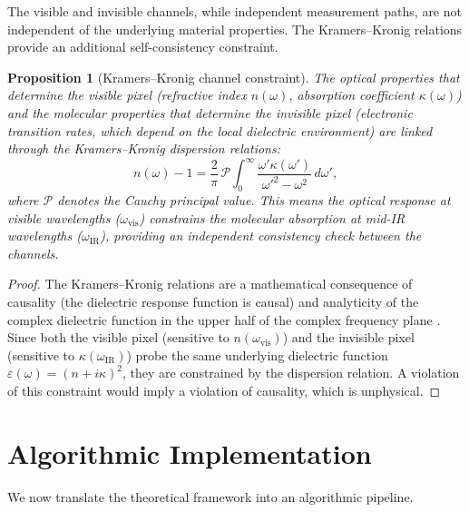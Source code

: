 \documentclass[11pt,twocolumn,a4paper]{article}
\newtheorem{proposition}[theorem]{Proposition}
\begin{document}
The visible and invisible channels, while independent measurement paths, are not independent of the underlying material properties.
The Kramers--Kronig relations \citep{Kramers1927,Kronig1926} provide an additional self-consistency constraint.

\begin{proposition}[Kramers--Kronig channel constraint]\label{prop:kk}
The optical properties that determine the visible pixel (refractive index $n(\omega)$, absorption coefficient $\kappa(\omega)$) and the molecular properties that determine the invisible pixel (electronic transition rates, which depend on the local dielectric environment) are linked through the Kramers--Kronig dispersion relations:
\begin{equation}\label{eq:kk}
n(\omega) - 1 = \frac{2}{\pi}\, \mathcal{P}\!\!\int_0^\infty \frac{\omega' \kappa(\omega')}{\omega'^2 - \omega^2}\, d\omega',
\end{equation}
where $\mathcal{P}$ denotes the Cauchy principal value.
This means the optical response at visible wavelengths ($\omega_{\mathrm{vis}}$) constrains the molecular absorption at mid-IR wavelengths ($\omega_{\mathrm{IR}}$), providing an independent consistency check between the channels.
\end{proposition}
\begin{proof}
The Kramers--Kronig relations are a mathematical consequence of causality (the dielectric response function is causal) and analyticity of the complex dielectric function in the upper half of the complex frequency plane \citep{Jackson1999}.
Since both the visible pixel (sensitive to $n(\omega_{\mathrm{vis}})$) and the invisible pixel (sensitive to $\kappa(\omega_{\mathrm{IR}})$) probe the same underlying dielectric function $\varepsilon(\omega) = (n + i\kappa)^2$, they are constrained by the dispersion relation.
A violation of this constraint would imply a violation of causality, which is unphysical.
\end{proof}


\section{Algorithmic Implementation}\label{sec:algorithm}

We now translate the theoretical framework into an algorithmic pipeline.
\end{document}
